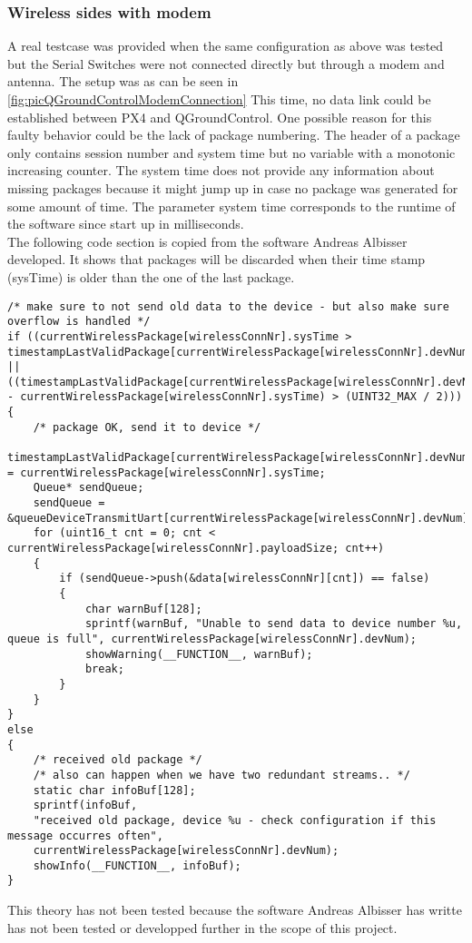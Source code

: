 \subsubsection{Wireless sides with modem}
%
A real testcase was provided when the same configuration as above was tested but the Serial Switches were not connected directly but through a modem and antenna. The setup was as can be seen in \autoref{fig:picQGroundControlModemConnection}
This time, no data link could be established between PX4 and QGroundControl. One possible reason for this faulty behavior could be the lack of package numbering. The header of a package only contains session number and system time but no variable with a monotonic increasing counter. The system time does not provide any information about missing packages because it might jump up in case no package was generated for some amount of time. The parameter system time corresponds to the runtime of the software since start up in milliseconds.\\
The following code section is copied from the software Andreas Albisser developed. It shows that packages will be discarded when their time stamp (sysTime) is older than the one of the last package.
%
\begin{lstlisting}
/* make sure to not send old data to the device - but also make sure overflow is handled */
if ((currentWirelessPackage[wirelessConnNr].sysTime > timestampLastValidPackage[currentWirelessPackage[wirelessConnNr].devNum]) ||
((timestampLastValidPackage[currentWirelessPackage[wirelessConnNr].devNum] - currentWirelessPackage[wirelessConnNr].sysTime) > (UINT32_MAX / 2)))
{
    /* package OK, send it to device */
    timestampLastValidPackage[currentWirelessPackage[wirelessConnNr].devNum] = currentWirelessPackage[wirelessConnNr].sysTime;
    Queue* sendQueue;
    sendQueue = &queueDeviceTransmitUart[currentWirelessPackage[wirelessConnNr].devNum];
    for (uint16_t cnt = 0; cnt < currentWirelessPackage[wirelessConnNr].payloadSize; cnt++)
    {
        if (sendQueue->push(&data[wirelessConnNr][cnt]) == false)
        {
            char warnBuf[128];
            sprintf(warnBuf, "Unable to send data to device number %u, queue is full", currentWirelessPackage[wirelessConnNr].devNum);
            showWarning(__FUNCTION__, warnBuf);
            break;
        }
    }
}
else
{
    /* received old package */
    /* also can happen when we have two redundant streams.. */
    static char infoBuf[128];
    sprintf(infoBuf, 
    "received old package, device %u - check configuration if this message occurres often",
    currentWirelessPackage[wirelessConnNr].devNum);
    showInfo(__FUNCTION__, infoBuf);
}
\end{lstlisting}
%
This theory has not been tested because the software Andreas Albisser has writte has not been tested or developped further in the scope of this project.\\
%
%
